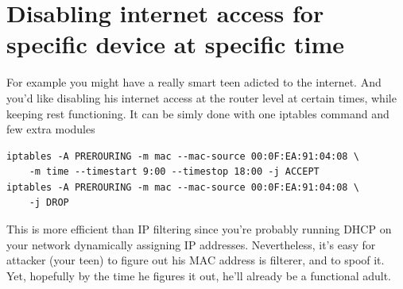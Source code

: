 \documentclass[times, utf8, seminar, english]{fer}
\begin{document}
\section{Disabling internet access for specific device at specific time}

For example you might have a really smart teen adicted to the internet.
And you'd like disabling his internet access at the router level at certain times, while keeping rest functioning.
It can be simly done with one iptables command and few extra modules

\begin{verbatim}
iptables -A PREROURING -m mac --mac-source 00:0F:EA:91:04:08 \
    -m time --timestart 9:00 --timestop 18:00 -j ACCEPT
iptables -A PREROURING -m mac --mac-source 00:0F:EA:91:04:08 \
    -j DROP
\end{verbatim}

This is more efficient than IP filtering since you're probably running DHCP on your network dynamically assigning IP addresses.
Nevertheless, it's easy for attacker (your teen) to figure out his MAC address is filterer, and to spoof it.
Yet, hopefully by the time he figures it out, he'll already be a functional adult.



\end{document}
